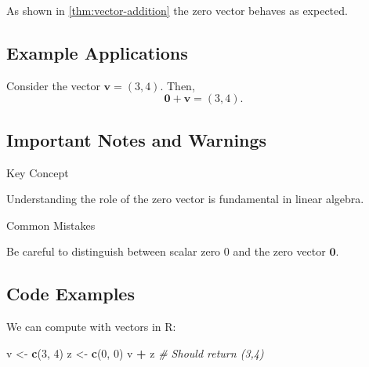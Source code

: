 \documentclass[
]{article}
\newenvironment{Shaded}{\begin{snugshade}}{\end{snugshade}}
\newcommand{\CommentTok}[1]{\textcolor[rgb]{0.56,0.35,0.01}{\textit{#1}}}
\newcommand{\DecValTok}[1]{\textcolor[rgb]{0.00,0.00,0.81}{#1}}
\newcommand{\FunctionTok}[1]{\textcolor[rgb]{0.13,0.29,0.53}{\textbf{#1}}}
\newcommand{\NormalTok}[1]{#1}
\newcommand{\OtherTok}[1]{\textcolor[rgb]{0.56,0.35,0.01}{#1}}
\newcommand{\SpecialCharTok}[1]{\textcolor[rgb]{0.81,0.36,0.00}{\textbf{#1}}}
\begin{document}
As shown in \autoref{thm:vector-addition} the zero vector behaves as
expected.

\subsection{Example Applications}\label{example-applications}

\begin{example}\label{ex:vector-example}

Consider the vector \(\mathbf{v} = (3,4)\). Then, \[
\mathbf{0} + \mathbf{v} = (3,4).
\]

\end{example}

\subsection{Important Notes and
Warnings}\label{important-notes-and-warnings}

\begin{importantbox}{Key Concept}

Understanding the role of the zero vector is fundamental in linear
algebra.

\end{importantbox}

\begin{warningbox}{Common Mistakes}

Be careful to distinguish between scalar zero \(0\) and the zero vector
\(\mathbf{0}\).

\end{warningbox}

\subsection{Code Examples}\label{code-examples}

We can compute with vectors in R:

\begin{Shaded}
\begin{Highlighting}[]
\NormalTok{v }\OtherTok{\textless{}{-}} \FunctionTok{c}\NormalTok{(}\DecValTok{3}\NormalTok{, }\DecValTok{4}\NormalTok{)}
\NormalTok{z }\OtherTok{\textless{}{-}} \FunctionTok{c}\NormalTok{(}\DecValTok{0}\NormalTok{, }\DecValTok{0}\NormalTok{)}
\NormalTok{v }\SpecialCharTok{+}\NormalTok{ z  }\CommentTok{\# Should return (3,4)}
\end{Highlighting}
\end{Shaded}
\end{document}
